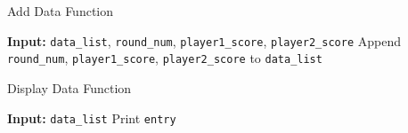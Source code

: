 \documentclass{article}
\begin{document}
\begin{algorithm}[H]
\caption{Add Data Function}
\begin{algorithmic}[1]
\STATE \textbf{Input:} \texttt{data\_list}, \texttt{round\_num}, \texttt{player1\_score}, \texttt{player2\_score}
\STATE Append \texttt{round\_num}, \texttt{player1\_score}, \texttt{player2\_score} to \texttt{data\_list}
\end{algorithmic}
\end{algorithm}

\begin{algorithm}[H]
\caption{Display Data Function}
\begin{algorithmic}[1]
\STATE \textbf{Input:} \texttt{data\_list}
    \STATE Print \texttt{entry}
\ENDFOR
\end{algorithmic}
\end{algorithm}
\end{document}
